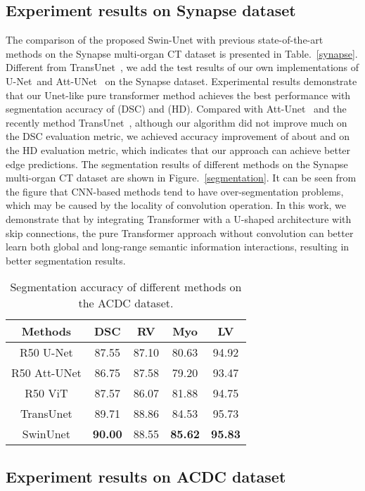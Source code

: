 \documentclass[runningheads]{llncs}
\begin{document}
\subsection{Experiment results on Synapse dataset}
The comparison of the proposed Swin-Unet with previous state-of-the-art methods on the Synapse multi-organ CT dataset is presented in Table.~\ref{synapse}. Different from TransUnet~\cite{trans-unet}, we add the test results of our own implementations of U-Net~\cite{unet}and Att-UNet~\cite{att-unet} on the Synapse dataset. Experimental results demonstrate that our Unet-like pure transformer method achieves the best performance with segmentation accuracy of (DSC) and (HD). Compared with Att-Unet~\cite{att-unet} and the recently method TransUnet~\cite{trans-unet}, although our algorithm did not improve much on the DSC evaluation metric, we achieved accuracy improvement of about  and  on the HD evaluation metric, which indicates that our approach can achieve better edge predictions.
The segmentation results of different methods on the Synapse multi-organ CT dataset are shown in Figure.~\ref{segmentation}. It can be seen from the figure that CNN-based methods tend to have over-segmentation problems, which may be caused by the locality of convolution operation. 
In this work, we demonstrate that by integrating Transformer with a U-shaped architecture with skip connections, the pure Transformer approach without convolution can better learn both global and long-range semantic information interactions, resulting in better segmentation results.


\begin{table}[t!]
\caption{Segmentation accuracy of different methods on the ACDC dataset.}\label{acdc}
\begin{tabular}{c|c|ccc}
\hline
Methods & DSC& RV & Myo& LV\\
\hline
R50 U-Net & 87.55 & 87.10&80.63& 94.92\\
R50 Att-UNet  & 86.75& 87.58&79.20&93.47 \\
R50 ViT & 87.57&86.07&81.88&94.75\\
TransUnet & 89.71&88.86&84.53&95.73 \\
\hline
SwinUnet & \textbf{90.00} &88.55&\textbf{85.62}&\textbf{95.83}\\
\hline
\end{tabular}
\centering
\end{table}

\subsection{Experiment results on ACDC dataset}
\end{document}
